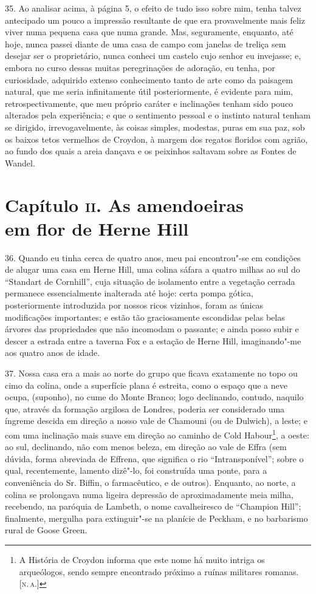 35. Ao analisar acima, à página 5, o efeito de tudo isso sobre mim,
tenha talvez antecipado um pouco a impressão resultante de que era
provavelmente mais feliz viver numa pequena casa que numa grande. Mas,
seguramente, enquanto, até hoje, nunca passei diante de uma casa de
campo com janelas de treliça sem desejar ser o proprietário, nunca
conheci um castelo cujo senhor eu invejasse; e, embora no curso dessas
muitas peregrinações de adoração, eu tenha, por curiosidade, adquirido
extenso conhecimento tanto de arte como da paisagem natural, que me
seria infinitamente útil posteriormente, é evidente para mim,
retrospectivamente, que meu próprio caráter e inclinações tenham sido
pouco alterados pela experiência; e que o sentimento pessoal e o
instinto natural tenham se dirigido, irrevogavelmente, às coisas
simples, modestas, puras em sua paz, sob os baixos tetos vermelhos de
Croydon, à margem dos regatos floridos com agrião, ao fundo dos quais a
areia dançava e os peixinhos saltavam sobre as Fontes de Wandel.

\chapter[Capítulo \textsc{ii}. As amendoeiras em flor de Herne Hill]{Capítulo \textsc{ii}. As amendoeiras\\ em flor de Herne Hill}

36. Quando eu tinha cerca de quatro anos, meu pai encontrou"-se em
condições de alugar uma casa em Herne Hill, uma colina sáfara a quatro
milhas ao sul do ``Standart de Cornhill'', cuja situação de isolamento
entre a vegetação cerrada permanece essencialmente inalterada até hoje:
certa pompa gótica, posteriormente introduzida por nossos ricos
vizinhos, foram as únicas modificações importantes; e estão tão
graciosamente escondidas pelas belas árvores das propriedades que não
incomodam o passante; e ainda posso subir e descer a estrada entre a
taverna Fox e a estação de Herne Hill, imaginando"-me aos quatro anos de
idade.

37. Nossa casa era a mais ao norte do grupo que ficava exatamente no
topo ou cimo da colina, onde a superfície plana é estreita, como o
espaço que a neve ocupa, (suponho), no cume do Monte Branco; logo
declinando, contudo, naquilo que, através da formação argilosa de
Londres, poderia ser considerado uma íngreme descida em direção a nosso
vale de Chamouni (ou de Dulwich), a leste; e com uma inclinação mais
suave em direção ao caminho de Cold Habour\footnote{A História de
  Croydon informa que este nome há muito intriga os arqueólogos, sendo
  sempre encontrado próximo a ruínas militares romanas. {[}\textsc{n.\,a.}{]}},
a oeste: ao sul, declinando, não com menos beleza, em direção ao vale de
Effra (sem dúvida, forma abreviada de Effrena, que significa o rio
``Intransponível''; sobre o qual, recentemente, lamento dizê"-lo, foi
construída uma ponte, para a conveniência do Sr. Biffin, o farmacêutico,
e de outros). Enquanto, ao norte, a colina se prolongava numa ligeira
depressão de aproximadamente meia milha, recebendo, na paróquia de
Lambeth, o nome cavalheiresco de ``Champion Hill''; finalmente, mergulha
para extinguir"-se na planície de Peckham, e no barbarismo rural de Goose
Green.

